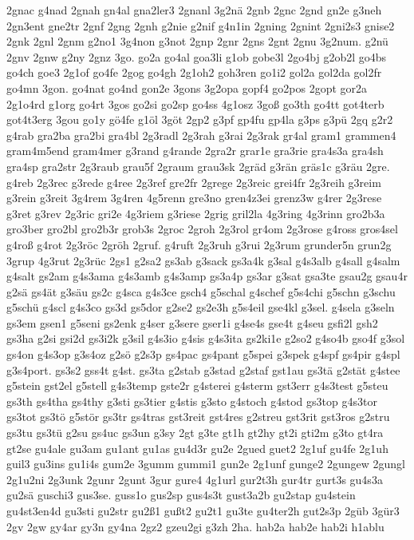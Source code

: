 {2gnac
g4nad
2gnah
gn4al
gna2ler3
2gnanl
3g2nä
2gnb
2gnc
2gnd
gn2e
g3neh
2gn3ent
gne2tr
2gnf
2gng
2gnh
g2nie
g2nif
g4n1in
2gning
2gnint
2gni2s3
gnise2
2gnk
2gnl
2gnm
g2no1
3g4non
g3not
2gnp
2gnr
2gns
2gnt
2gnu
3g2num.
g2nü
2gnv
2gnw
g2ny
2gnz
3go.
go2a
go4al
goa3li
g1ob
gobe3l
2go4bj
g2ob2l
go4bs
go4ch
goe3
2g1of
go4fe
2gog
go4gh
2g1oh2
goh3ren
go1i2
gol2a
gol2da
gol2fr
go4mn
3gon.
go4nat
go4nd
gon2e
3gons
3g2opa
gopf4
go2pos
2gopt
gor2a
2g1o4rd
g1org
go4rt
3gos
go2si
go2sp
go4ss
4g1osz
3goß
go3th
go4tt
got4terb
got4t3erg
3gou
go1y
gö4fe
g1öl
3göt
2gp2
g3pf
gp4fu
gp4la
g3ps
g3pü
2gq
g2r2
g4rab
gra2ba
gra2bi
gra4bl
2g3radl
2g3rah
g3rai
2g3rak
gr4al
gram1
grammen4
gram4m5end
gram4mer
g3rand
g4rande
2gra2r
grar1e
gra3rie
gra4s3a
gra4sh
gra4sp
gra2str
2g3raub
grau5f
2graum
grau3sk
2gräd
g3rän
gräs1c
g3räu
2gre.
g4reb
2g3rec
g3rede
g4ree
2g3ref
gre2fr
2grege
2g3reic
grei4fr
2g3reih
g3reim
g3rein
g3reit
3g4rem
3g4ren
4g5renn
gre3no
gren4z3ei
grenz3w
g4rer
2g3rese
g3ret
g3rev
2g3ric
gri2e
4g3riem
g3riese
2grig
gril2la
4g3ring
4g3rinn
gro2b3a
gro3ber
gro2bl
gro2b3r
grob3s
2groc
2groh
2g3rol
gr4om
2g3rose
g4ross
gros4sel
g4roß
g4rot
2g3röc
2gröh
2gruf.
g4ruft
2g3ruh
g3rui
2g3rum
grunder5n
grun2g
3grup
4g3rut
2g3rüc
2gs1
g2sa2
gs3ab
g3sack
gs3a4k
g3sal
g4s3alb
g4sall
g4salm
g4salt
gs2am
g4s3ama
g4s3amb
g4s3amp
gs3a4p
gs3ar
g3sat
gsa3te
gsau2g
gsau4r
g2sä
gs4ät
g3säu
gs2c
g4sca
g4s3ce
gsch4
g5schal
g4schef
g5s4chi
g5schn
g3schu
g5schü
g4scl
g4s3co
gs3d
gs5dor
g2se2
gs2e3h
g5s4eil
gse4kl
g3sel.
g4sela
g3seln
gs3em
gsen1
g5seni
gs2enk
g4ser
g3sere
gser1i
g4se4s
gse4t
g4seu
gsfi2l
gsh2
gs3ha
g2si
gsi2d
gs3i2k
g3sil
g4s3io
g4sis
g4s3ita
gs2ki1e
g2so2
g4so4b
gso4f
g3sol
gs4on
g4s3op
g3s4oz
g2sö
g2s3p
gs4pac
gs4pant
g5spei
g3spek
g4spf
gs4pir
g4spl
g3s4port.
gs3s2
gss4t
g4st.
gs3ta
g2stab
g3stad
g2staf
gst1au
gs3tä
g2stät
g4stee
g5stein
gst2el
g5stell
g4s3temp
gste2r
g4sterei
g4sterm
gst3err
g4s3test
g5steu
gs3th
gs4tha
gs4thy
g3sti
gs3tier
g4stis
g3sto
g4stoch
g4stod
gs3top
g4s3tor
gs3tot
gs3tö
g5stör
gs3tr
gs4tras
gst3reit
gst4res
g2streu
gst3rit
gst3ros
g2stru
gs3tu
gs3tü
g2su
gs4uc
gs3un
g3sy
2gt
g3te
gt1h
gt2hy
gt2i
gti2m
g3to
gt4ra
gt2se
gu4ale
gu3am
gu1ant
gu1as
gu4d3r
gu2e
2gued
guet2
2g1uf
gu4fe
2g1uh
guil3
gu3ins
gu1i4s
gum2e
3gumm
gummi1
gun2e
2g1unf
gunge2
2gungew
2gungl
2g1u2ni
2g3unk
2gunr
2gunt
3gur
gure4
4g1url
gur2t3h
gur4tr
gurt3s
gu4s3a
gu2sä
guschi3
gus3se.
guss1o
gus2sp
gus4s3t
gust3a2b
gu2stap
gu4stein
gu4st3en4d
gu3sti
gu2str
gu2ß1
gußt2
gu2t1
gu3te
gu4ter2h
gut2s3p
2güb
3gür3
2gv
2gw
gy4ar
gy3n
gy4na
2gz2
gzeu2gi
g3zh
2ha.
hab2a
hab2e
hab2i
h1ablu
}
